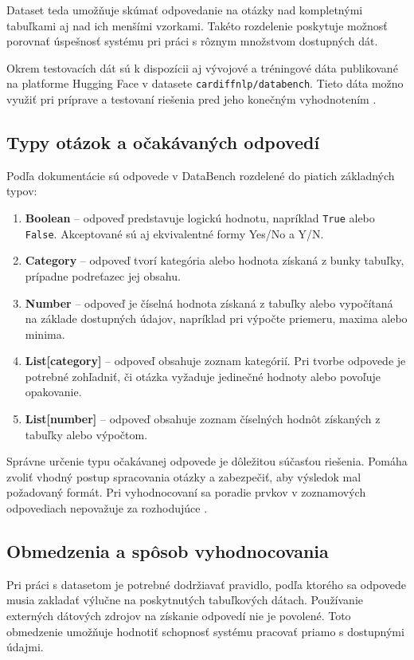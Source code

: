 Dataset teda umožňuje skúmať odpovedanie na otázky nad kompletnými tabuľkami aj nad ich menšími vzorkami. Takéto rozdelenie poskytuje možnosť porovnať úspešnosť systému pri práci s rôznym množstvom dostupných dát.

Okrem testovacích dát sú k dispozícii aj vývojové a tréningové dáta publikované na platforme Hugging Face v datasete \texttt{cardiffnlp/databench}. Tieto dáta možno využiť pri príprave a testovaní riešenia pred jeho konečným vyhodnotením \cite{hfdatabench}.

\subsection{Typy otázok a očakávaných odpovedí}

Podľa dokumentácie sú odpovede v DataBench rozdelené do piatich základných typov:
\begin{enumerate}
    \item \textbf{Boolean} -- odpoveď predstavuje logickú hodnotu, napríklad \texttt{True} alebo \texttt{False}. Akceptované sú aj ekvivalentné formy Yes/No a Y/N.
    \item \textbf{Category} -- odpoveď tvorí kategória alebo hodnota získaná z bunky tabuľky, prípadne podreťazec jej obsahu.
    \item \textbf{Number} -- odpoveď je číselná hodnota získaná z tabuľky alebo vypočítaná na základe dostupných údajov, napríklad pri výpočte priemeru, maxima alebo minima.
    \item \textbf{List[category]} -- odpoveď obsahuje zoznam kategórií. Pri tvorbe odpovede je potrebné zohľadniť, či otázka vyžaduje jedinečné hodnoty alebo povoľuje opakovanie.
    \item \textbf{List[number]} -- odpoveď obsahuje zoznam číselných hodnôt získaných z tabuľky alebo výpočtom.
\end{enumerate}

Správne určenie typu očakávanej odpovede je dôležitou súčasťou riešenia. Pomáha zvoliť vhodný postup spracovania otázky a zabezpečiť, aby výsledok mal požadovaný formát. Pri vyhodnocovaní sa poradie prvkov v zoznamových odpovediach nepovažuje za rozhodujúce \cite{hfdatabench,databencheval}.

\subsection{Obmedzenia a spôsob vyhodnocovania}

Pri práci s datasetom je potrebné dodržiavať pravidlo, podľa ktorého sa odpovede musia zakladať výlučne na poskytnutých tabuľkových dátach. Používanie externých dátových zdrojov na získanie odpovedí nie je povolené. Toto obmedzenie umožňuje hodnotiť schopnosť systému pracovať priamo s dostupnými údajmi.

